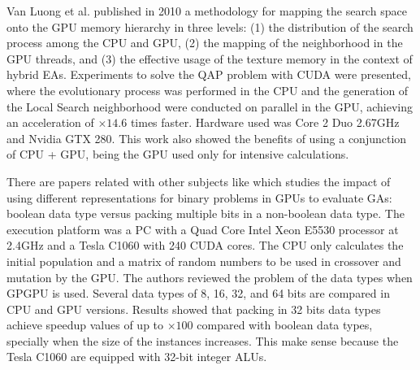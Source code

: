 \documentclass{article}
\begin{document}
Van Luong et al. \cite{5586403} published in 2010 a methodology for mapping the search space onto the GPU memory hierarchy in three levels: (1) the distribution of the search process among the CPU and GPU, (2) the mapping of the neighborhood in the GPU threads, and (3) the effective usage of the texture memory in the context of hybrid EAs. Experiments to solve the QAP problem with CUDA were presented, where the evolutionary process was performed in the CPU and the generation of the Local Search neighborhood were conducted on parallel in the GPU, achieving an acceleration of $\times14.6$ times faster. Hardware used was Core 2 Duo 2.67GHz and Nvidia GTX 280. This work also showed the benefits of using a conjunction of CPU + GPU, being the GPU used only for intensive calculations.


There are papers related with other subjects %
like \cite{Pedemonte:2011:BOG:2001858.2002031} which studies the impact of using different representations for binary problems in GPUs to evaluate GAs: boolean data type versus packing multiple bits in a non-boolean data type. The execution platform was a PC with a Quad Core Intel Xeon E5530 processor at 2.4GHz and a Tesla C1060 with 240 CUDA cores. The CPU only calculates the initial population and a matrix of random numbers to be used in crossover and mutation by the GPU. The authors reviewed the problem of the data types when GPGPU is used. Several data types of 8, 16, 32, and 64 bits are compared in CPU and GPU versions. Results showed that packing in 32 bits data types achieve speedup values of up to $\times100$ compared with boolean data types, specially when the size
of the instances increases. This make sense because the Tesla C1060
are equipped with 32-bit integer ALUs.
\end{document}
